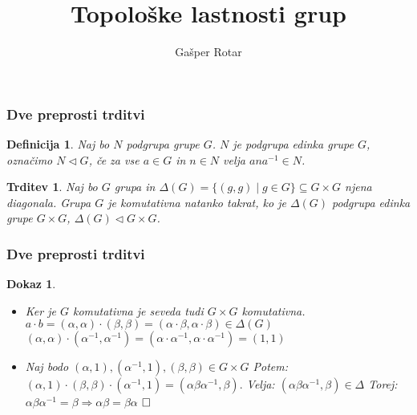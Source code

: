 \documentclass{beamer}
\title{Topološke lastnosti grup}
\author{Gašper Rotar}
\institute{Fakulteta za matematiko in fiziko}
\def\qed{$\hfill\Box$}   %
\newtheorem{trditev}{Trditev}
\newtheorem{definicija}{Definicija}
\newtheorem{dokaz}{Dokaz}
\begin{document}

\begin{frame}
\titlepage
\end{frame}


\begin{frame}
\frametitle{Dve preprosti trditvi}

\begin{definicija}
    Naj bo $N$ podgrupa grupe $G$. $N$ je podgrupa \emph{edinka} grupe $G$, označimo $N \triangleleft G$, če za vse $a \in G$ in $n \in N$ velja $ana^{-1} \in N$.
\end{definicija}

\pause

\begin{trditev}
    Naj bo $G$ grupa in $\Delta(G) = \{(g,g) \mid g \in G \} \subseteq G \times G$ njena diagonala.
    Grupa $G$ je komutativna natanko takrat, ko je $\Delta(G)$ podgrupa edinka grupe $G \times G$, $\Delta(G) \triangleleft G \times G$.
\end{trditev}

\end{frame}

\begin{frame}
\frametitle{Dve preprosti trditvi}

\begin{dokaz}
    \begin{itemize}
        \item[($\Rightarrow$)]
            Ker je $G$ komutativna je seveda tudi $G \times G$ komutativna.
            \pause
            $a \cdot b = (\alpha, \alpha) \cdot (\beta, \beta) = (\alpha \cdot \beta, \alpha \cdot \beta) \in \Delta(G)$
            \pause
            $(\alpha, \alpha) \cdot (\alpha^{-1}, \alpha^{-1}) = (\alpha \cdot \alpha^{-1}, \alpha \cdot \alpha^{-1}) = (1,1)$
            \pause
            \bigskip
        \item[($\Leftarrow$)]
            Naj bodo $(\alpha,1), (\alpha^{-1}, 1), (\beta, \beta) \in G \times G$
            \newline
            \pause
            Potem: $(\alpha,1) \cdot (\beta, \beta) \cdot (\alpha^{-1}, 1) = (\alpha\beta\alpha^{-1}, \beta).$
            \newline
            \pause
            Velja: $(\alpha\beta\alpha^{-1}, \beta) \in \Delta$
            \newline
            \pause
            Torej:$\alpha\beta\alpha^{-1} = \beta \Rightarrow \alpha\beta = \beta\alpha$
            \newline
            \pause
            \qed
    \end{itemize}
\end{dokaz}

\end{frame}
\end{document}
